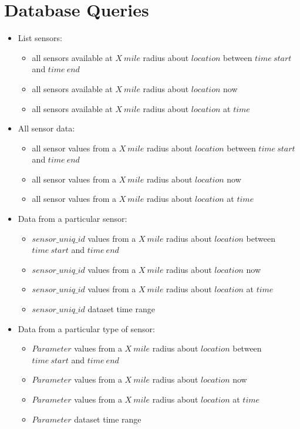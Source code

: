 \section{Database Queries}
\begin{itemize}
\item List sensors:
\begin{itemize}
\item all sensors available at $X\ mile$ radius about $location$ between $time\ start$ and $time\ end$
\item all sensors available at $X\ mile$ radius about $location$ now
\item all sensors available at $X\ mile$ radius about $location$ at $time$
\end{itemize}
\item All sensor data:
\begin{itemize}
\item all sensor values from a $X\ mile$ radius about $location$ between $time\ start$ and $time\ end$
\item all sensor values from a $X\ mile$ radius about $location$ now
\item all sensor values from a $X\ mile$ radius about $location$ at $time$
\end{itemize}
\item Data from a particular sensor: 
\begin{itemize}
\item $sensor\_uniq\_id$ values from a $X\ mile$ radius about $location$ between $time\ start$ and $time\ end$
\item $sensor\_uniq\_id$ values from a $X\ mile$ radius about $location$ now
\item $sensor\_uniq\_id$ values from a $X\ mile$ radius about $location$ at $time$
\item $sensor\_uniq\_id$ dataset time range 
\end{itemize}

\item Data from a particular type of sensor:
\begin{itemize}
\item $Parameter$ values from a $X\ mile$ radius about $location$ between $time\ start$ and $time\ end$
\item $Parameter$ values from a $X\ mile$ radius about $location$ now
\item $Parameter$ values from a $X\ mile$ radius about $location$ at $time$
\item $Parameter$ dataset time range
\end{itemize}
\end{itemize}
\newpage

